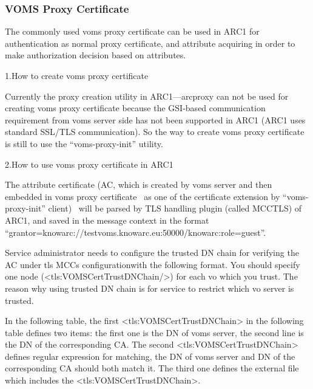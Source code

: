 \documentclass{article}
\begin{document}
\subsubsection{VOMS Proxy Certificate}
{\color{black}
The commonly used voms proxy certificate can be used in ARC1 for
authentication as normal proxy certificate, and attribute acquiring in
order to make authorization decision based on attributes.}

{\color{black}
1.How to create voms proxy certificate}

{\color{black}
Currently the proxy creation utility in ARC1---arcproxy can not be used
for creating voms proxy certificate because the GSI-based communication
requirement from voms server side has not been supported in ARC1 (ARC1
uses standard SSL/TLS communication). So the way to create voms proxy
certificate is still to use the
{\textquotedblleft}voms-proxy-init{\textquotedblright} utility.}

{\color{black}
2.How to use voms proxy certificate in ARC1}

{\color{black}
The attribute certificate (AC, which is created by voms server and then
embedded in voms proxy certificate \ as one of the certificate
extension by {\textquotedblleft}voms-proxy-init{\textquotedblright}
client) \ will be parsed by TLS handling plugin (called MCCTLS) of
ARC1, and saved in the message context in the format
{\textquotedblleft}grantor=knowarc://testvoms.knowarc.eu:50000/knowarc:role=guest{\textquotedblright}.}

{\color{black}
Service administrator needs to configure the trusted DN chain for
verifying the AC under tls MCC{\textquotesingle}s configurationwith the
following format. You should specify one node
({\textless}tls:VOMSCertTrustDNChain/{\textgreater}) for each vo which
you trust. The reason why using trusted DN chain is for service to
restrict which vo server is trusted. }

{\color{black}
In the following table, the first
{\textless}tls:VOMSCertTrustDNChain{\textgreater} in the following
table defines two items: the first one is the DN of voms server, the
second line is the DN of the corresponding CA. The second
{\textless}tls:VOMSCertTrustDNChain{\textgreater} defines regular
expression for matching, the DN of voms server and DN of the
corresponding CA should both match it. The third one defines the
external file which includes the
{\textless}tls:VOMSCertTrustDNChain{\textgreater}.}
\end{document}
